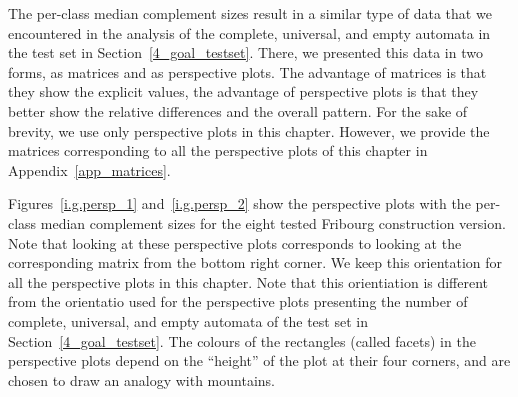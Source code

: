 The per-class median complement sizes result in a similar type of data that we encountered in the analysis of the complete, universal, and empty automata in the \goal{} test set in Section~\ref{4_goal_testset}. There, we presented this data in two forms, as matrices and as perspective plots. The advantage of matrices is that they show the explicit values, the advantage of perspective plots is that they better show the relative differences and the overall pattern. For the sake of brevity, we use only perspective plots in this chapter. However, we provide the matrices corresponding to all the perspective plots of this chapter in Appendix~\ref{app_matrices}.

Figures~\ref{i.g.persp_1} and~\ref{i.g.persp_2} show the perspective plots with the per-class median complement sizes for the eight tested Fribourg construction version. Note that looking at these perspective plots corresponds to looking at the corresponding matrix from the bottom right corner. We keep this orientation for all the perspective plots in this chapter. Note that this orientiation is different from the orientatio used for the perspective plots presenting the number of complete, universal, and empty automata of the \goal{} test set in Section~\ref{4_goal_testset}. The colours of the rectangles (called facets) in the perspective plots depend on the ``height'' of the plot at their four corners, and are chosen to draw an analogy with mountains.

\newcommand{\perspwidth}{0.475}

